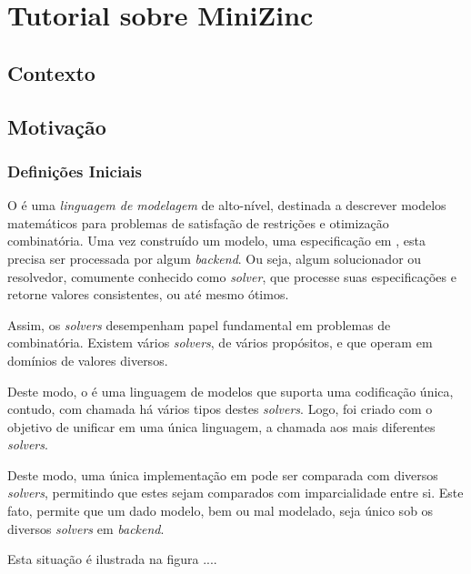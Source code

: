 \chapter{Tutorial sobre  MiniZinc}


\section{Contexto}







\section{Motivação}

\subsection{Definições Iniciais}

O \mzn é uma \textit{linguagem de modelagem} de alto-nível,
 destinada a descrever  modelos matemáticos para problemas
 de satisfação de restrições e otimização combinatória. Uma
 vez construído um modelo, uma especificação em \mzn, esta precisa
 ser processada por algum \textit{backend}. Ou seja, algum   solucionador ou resolvedor, comumente conhecido como \textit{solver},
 que processe suas especificações e retorne valores
 consistentes, ou até mesmo ótimos.

Assim, os \textit{solvers} desempenham papel fundamental em
problemas de combinatória. Existem vários \textit{solvers}, de vários
propósitos, e que operam em domínios de valores diversos.

Deste modo, o \mzn é uma linguagem de modelos que suporta uma
codificação única, contudo, com chamada há vários tipos destes \textit{solvers}. Logo, \mzn  foi criado com o objetivo de unificar
em uma única linguagem, a chamada aos mais diferentes \textit{solvers}.

Deste modo, uma única implementação em \mzn pode ser comparada
com diversos \textit{solvers}, permitindo que estes sejam comparados
com imparcialidade entre si. Este fato, permite que um
dado modelo, bem ou mal modelado, seja único sob os diversos 
 \textit{solvers} em  \textit{backend}.

Esta situação é ilustrada na figura ....

